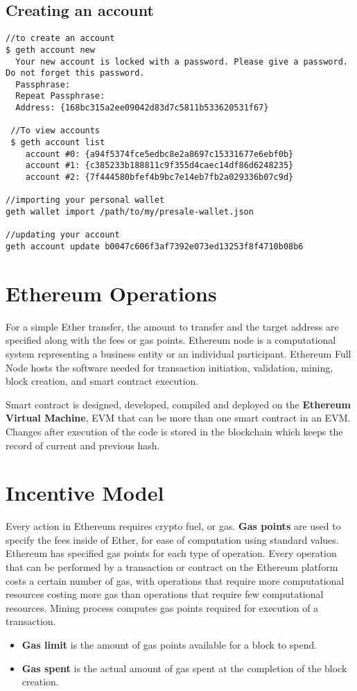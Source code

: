 \documentclass{article}
\begin{document}
\subsection{Creating an account}
\begin{lstlisting}[language=Solidity]
//to create an account
$ geth account new
  Your new account is locked with a password. Please give a password. Do not forget this password.
  Passphrase:
  Repeat Passphrase:
  Address: {168bc315a2ee09042d83d7c5811b533620531f67}
 
 //To view accounts
 $ geth account list
    account #0: {a94f5374fce5edbc8e2a8697c15331677e6ebf0b}
    account #1: {c385233b188811c9f355d4caec14df86d6248235}
    account #2: {7f444580bfef4b9bc7e14eb7fb2a029336b07c9d}
    
//importing your personal wallet
geth wallet import /path/to/my/presale-wallet.json

//updating your account
geth account update b0047c606f3af7392e073ed13253f8f4710b08b6
\end{lstlisting}

\section{Ethereum Operations}
For a simple Ether transfer, the amount to transfer and the target address are specified along with the fees or gas points. Ethereum node is a computational system representing a business entity or an individual participant. Ethereum Full Node hosts the software needed for transaction initiation, validation, mining, block creation, and smart contract execution. \par
Smart contract is designed, developed, compiled and deployed on the \textbf{Ethereum Virtual Machine}, EVM that can be more than one smart contract in an EVM. Changes after execution of the code is stored in the blockchain which keeps the record of current and previous hash. 
\section{Incentive Model}
Every action in Ethereum requires crypto fuel, or gas. \textbf{Gas points} are used to specify the fees inside of Ether, for ease of computation using standard values.
Ethereum has specified gas points for each type of operation. Every operation that can be performed by a transaction or contract on the Ethereum platform costs a certain number of gas, with operations that require more computational resources costing more gas than operations that require few computational resources. Mining process computes gas points required for execution of a transaction.
\begin{itemize}
    \item \textbf{Gas limit} is the amount of gas points available for a block to spend.
    \item \textbf{Gas spent} is the actual amount of gas spent at the completion of the block creation. 
\end{itemize}
\end{document}
